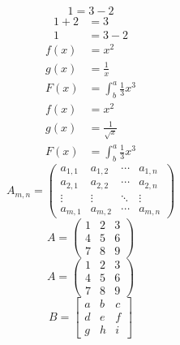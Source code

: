 \documentclass[a4paper,12pt]{article}
\begin{document}
\begin{equation*}
  1 = 3 - 2
\end{equation*}
\begin{align*}
  1 + 2 &= 3\\
  1 &= 3 - 2
\end{align*}
\begin{align*}
  f(x) &= x^2\\
  g(x) &= \frac{1}{x}\\
  F(x) &= \int^a_b \frac{1}{3}x^3
\end{align*}
\begin{align*}
  f(x) &= x^2\\
  g(x) &= \frac{1}{\sqrt{x}}\\
  F(x) &= \int^a_b \frac{1}{3}x^3
\end{align*}
\begin{equation*}
A_{m,n} = 
\begin{pmatrix}
a_{1,1} & a_{1,2} & \cdots & a_{1,n} \\
a_{2,1} & a_{2,2} & \cdots & a_{2,n} \\
\vdots  & \vdots  & \ddots & \vdots  \\
a_{m,1} & a_{m,2} & \cdots & a_{m,n} 
\end{pmatrix}
\end{equation*}
\begin{equation*}
A = 
\begin{pmatrix}
1 & 2 & 3 \\
4 & 5 & 6 \\
7 & 8 & 9
\end{pmatrix}
\end{equation*}
\begin{equation*}
A = 
\begin{pmatrix}
1 & 2 & 3 \\
4 & 5 & 6 \\
7 & 8 & 9
\end{pmatrix}
\end{equation*}
\begin{equation*}
B = 
\begin{bmatrix}
a & b & c \\
d & e & f \\
g & h & i
\end{bmatrix}
\end{equation*}
\end{document}
